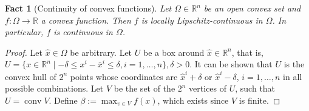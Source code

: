 \documentclass[smallextended,numbook,nospthms]{svjour3}
\theoremstyle{plain}
\newtheorem{fact}[theorem]{Fact}
\theoremstyle{definition}
\def\RR{\mathds R}
\begin{document}
\begin{fact}[Continuity of convex functions]\label{fact:cont convex f}
	Let $\Omega \in \RR^n$ be an open convex set and $f:\Omega \rightarrow \RR$ a convex function. Then $f$ is locally Lipschitz-continuous in $\Omega$. In particular, $f$ is continuous in $\Omega$.
\end{fact}
\begin{proof}
	Let $\hat{x} \in \Omega$ be arbitrary. 	Let $U$ be a box around $\hat{x} \in \RR^n$, that is, $U = \{ x \in \RR^n \mid - \delta \leq x^i - \bar{x}^i \leq \delta, i=1, \ldots, n \}, \delta >0$. It can be shown that $U$ is the convex hull of $2^n$ points whose coordinates are $\hat{x}^i + \delta$ or $\hat{x}^i - \delta$, $i=1,\ldots,n$ in all possible combinations. Let $V$ be the set of the $2^n$ vertices of $U$, such that $U = \operatorname{conv} V$. Define $\beta:= \max_{v \in V}f(x)$, which exists since $V$ is finite. 
	

\end{proof}
\end{document}
